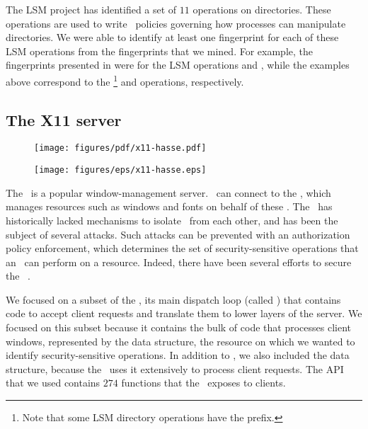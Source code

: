 
The LSM project has identified a set of $11$ operations on directories. These
operations are used to write \selinux\ policies governing how processes can
manipulate directories. We were able to identify at least one fingerprint for
each of these LSM operations from the fingerprints that we mined. For example,
the fingerprints presented in  were for the LSM
operations  and , while the examples
above correspond to the \footnote{Note that some LSM
directory operations have the  prefix.} and 
operations, respectively. 



\subsection{The X11 server}
\label{subsection:results:xserver}

\begin{figure}[ht!]
\begin{center}
\ifpdf
\centerline{\texttt{[image: figures/pdf/x11-hasse.pdf]}}
\else
\centerline{\texttt{[image: figures/eps/x11-hasse.eps]}}
\fi
\end{center} 
\end{figure}

The \xserver\ is a popular window-management server. \xclients\ can connect to
the \xserver, which manages resources such as windows and fonts on behalf of
these \xclients. The \xserver\ has historically lacked mechanisms to isolate
\xclients\ from each other, and has been the subject of several attacks.  Such
attacks can be prevented with an authorization policy enforcement, which
determines the set of security-sensitive operations that an \xclient\ can
perform on a resource. Indeed, there have been several efforts to secure the
\xserver~\cite{bpw+90,emo+93,ksv03}.

We focused on a subset of the \xserver, its main dispatch loop (called
) that contains code to accept client requests and translate them to
lower layers of the server. We focused on this subset because it contains the
bulk of code that processes client windows, represented by the 
data structure, the resource on which we wanted to identify security-sensitive
operations. In addition to , we also included the 
data structure, because the \xserver\ uses it extensively to process client
requests. The API that we used contains $274$ functions that the \xserver\
exposes to clients.

